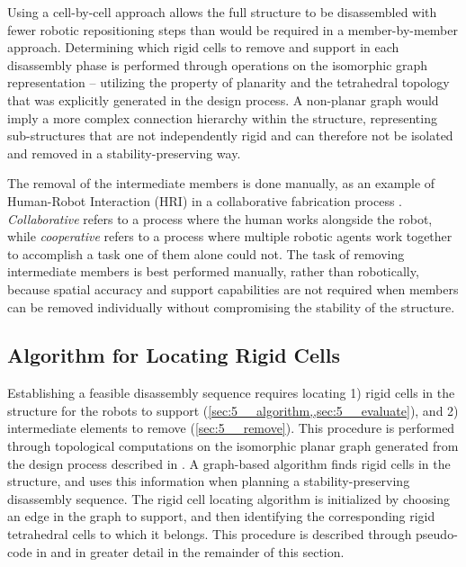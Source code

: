     Using a cell-by-cell approach allows the full structure to be disassembled with fewer robotic repositioning steps than would be required in a member-by-member approach. Determining which rigid cells to remove and support in each disassembly phase is performed through operations on the isomorphic graph representation -- utilizing the property of planarity and the tetrahedral topology that was explicitly generated in the design process. A non-planar graph would imply a more complex connection hierarchy within the structure, representing sub-structures that are not independently rigid and can therefore not be isolated and removed in a stability-preserving way.
    
    The removal of the intermediate members is done manually, as an example of Human-Robot Interaction (HRI) in a collaborative fabrication process \cite{bruun_humanrobot_2020, han_bridging_2021}. \textit{Collaborative} refers to a process where the human works alongside the robot, while \textit{cooperative} refers to a process where multiple robotic agents work together to accomplish a task one of them alone could not. The task of removing intermediate members is best performed manually, rather than robotically, because spatial accuracy and support capabilities are not required when members can be removed individually without compromising the stability of the structure.
    
\subsection{Algorithm for Locating Rigid Cells} \label{sec:5__algorithm}
    Establishing a feasible disassembly sequence requires locating 1) rigid cells in the structure for the robots to support (\cref{sec:5__algorithm,,sec:5__evaluate}), and 2) intermediate elements to remove (\cref{sec:5__remove}). This procedure is performed through topological computations on the isomorphic planar graph generated from the design process described in . A graph-based algorithm finds rigid cells in the structure, and uses this information when planning a stability-preserving disassembly sequence. The rigid cell locating algorithm is initialized by choosing an edge in the graph to support, and then identifying the corresponding rigid tetrahedral cells to which it belongs. This procedure is described through pseudo-code in  and in greater detail in the remainder of this section. 

